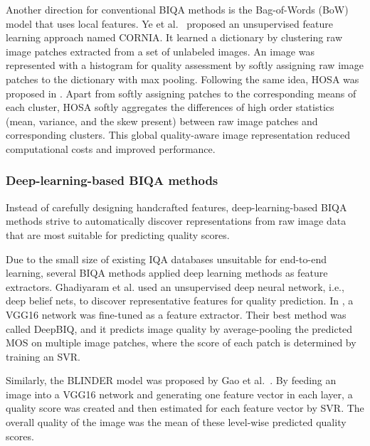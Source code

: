 \documentclass[10pt,journal,compsoc]{IEEEtran}
\begin{document}
Another direction for conventional BIQA methods is the Bag-of-Words (BoW) model that uses local features. Ye et al.\ \cite{ye2012unsupervised} proposed an unsupervised feature learning approach named CORNIA. It learned a dictionary by clustering raw image patches extracted from a set of unlabeled images. An image was represented with a histogram for quality assessment by softly assigning raw image patches to the dictionary with max pooling. Following the same idea, HOSA was proposed in \cite{hosa}. Apart from softly assigning patches to the corresponding means of each cluster, HOSA softly aggregates the differences of high order statistics (mean, variance, and the skew present) between raw image patches and corresponding clusters. This global quality-aware image representation reduced computational costs and improved performance.










\subsubsection{Deep-learning-based BIQA methods}
Instead of carefully designing handcrafted features, deep-learning-based BIQA methods strive to automatically discover representations from raw image data that are most suitable for predicting quality scores.




















Due to the small size of existing IQA databases unsuitable for end-to-end learning, several BIQA methods applied deep learning methods as feature extractors. Ghadiyaram et al. \cite{deepbelief} used an unsupervised deep neural network, i.e., deep belief nets, to discover representative features for quality prediction. In \cite{bianco2018use}, a VGG16 network was fine-tuned as a feature extractor. Their best method was called DeepBIQ, and it predicts image quality by average-pooling the predicted MOS on multiple image patches, where the score of each patch is determined by training an SVR.

Similarly, the BLINDER model was proposed by Gao et al.\ \cite{gao2018blind}. By feeding an image into a VGG16 network and generating one feature vector in each layer, a quality score was created and then estimated for each feature vector by SVR. The overall quality of the image was the mean of these level-wise predicted quality scores. 
\end{document}
